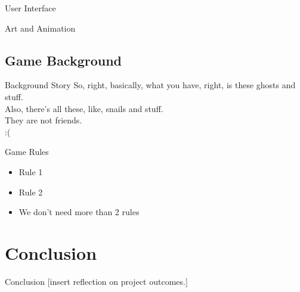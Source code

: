\documentclass{beamer}
\begin{document}
\begin{frame}{User Interface}
\end{frame}

\begin{frame}{Art and Animation}
\end{frame}

\subsection{Game Background}

\begin{frame}{Background Story}
  So, right, basically, what you have, right, is these ghosts and stuff. \\
  \vspace{\baselineskip}
  Also, there's all these, like, snails and stuff. \\
  \vspace{\baselineskip}
  They are not friends. \\
  \vspace{\baselineskip}
  :(
\end{frame}

\begin{frame}{Game Rules}
  \begin{itemize}
    \item Rule 1
    \item Rule 2
    \item We don't need more than 2 rules
  \end{itemize}
\end{frame}


\section{Conclusion}

\begin{frame}{Conclusion}
  [insert reflection on project outcomes.]
\end{frame}
\end{document}
